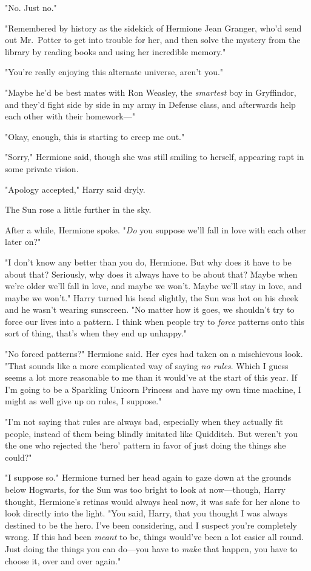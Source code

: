 "No. Just no."

"Remembered by history as the sidekick of Hermione Jean Granger, who'd send out
Mr.~Potter to get into trouble for her, and then solve the mystery from the
library by reading books and using her incredible memory."

"You're really enjoying this alternate universe, aren't you."

"Maybe he'd be best mates with Ron Weasley, the \emph{smartest} boy in
Gryffindor, and they'd fight side by side in my army in Defense class, and
afterwards help each other with their homework—"

"Okay, enough, this is starting to creep me out."

"Sorry," Hermione said, though she was still smiling to herself, appearing rapt
in some private vision.

"Apology accepted," Harry said dryly.

The Sun rose a little further in the sky.

After a while, Hermione spoke. "\emph{Do} you suppose we'll fall in love with
each other later on?"

"I don't know any better than you do, Hermione. But why does it have to be
about that? Seriously, why does it always have to be about that? Maybe when
we're older we'll fall in love, and maybe we won't. Maybe we'll stay in love,
and maybe we won't." Harry turned his head slightly, the Sun was hot on his
cheek and he wasn't wearing sunscreen. "No matter how it goes, we shouldn't try
to force our lives into a pattern. I think when people try to \emph{force}
patterns onto this sort of thing, that's when they end up unhappy."

"No forced patterns?" Hermione said. Her eyes had taken on a mischievous look.
"That sounds like a more complicated way of saying \emph{no rules}. Which I
guess seems a lot more reasonable to me than it would've at the start of this
year. If I'm going to be a Sparkling Unicorn Princess and have my own time
machine, I might as well give up on rules, I suppose."

"I'm not saying that rules are always bad, especially when they actually fit
people, instead of them being blindly imitated like Quidditch. But weren't you
the one who rejected the `hero' pattern in favor of just doing the things she
could?"

"I suppose so." Hermione turned her head again to gaze down at the grounds
below Hogwarts, for the Sun was too bright to look at now—though, Harry
thought, Hermione's retinas would always heal now, it was safe for her alone to
look directly into the light. "You said, Harry, that you thought I was always
destined to be the hero. I've been considering, and I suspect you're completely
wrong. If this had been \emph{meant} to be, things would've been a lot easier
all round. Just doing the things you can do—you have to \emph{make} that
happen, you have to choose it, over and over again."

